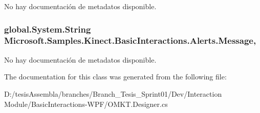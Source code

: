 No hay documentación de metadatos disponible. 

\hypertarget{class_microsoft_1_1_samples_1_1_kinect_1_1_basic_interactions_1_1_alerts_ab04d0ef02aabf1f3c600ee8a2063e6bb}{
\subsubsection[{Message}]{\setlength{\rightskip}{0pt plus 5cm}global.\-System.\-String Microsoft.\-Samples.\-Kinect.\-Basic\-Interactions.\-Alerts.\-Message\hspace{0.3cm}{\ttfamily [get]}, {\ttfamily [set]}}}\label{class_microsoft_1_1_samples_1_1_kinect_1_1_basic_interactions_1_1_alerts_ab04d0ef02aabf1f3c600ee8a2063e6bb}


No hay documentación de metadatos disponible. 



The documentation for this class was generated from the following file\-:\begin{DoxyCompactItemize}
\item 
D\-:/tesis\-Assembla/branches/\-Branch\-\_\-\-Tesis\-\_\-\-Sprint01/\-Dev/\-Interaction Module/\-Basic\-Interactions-\/\-W\-P\-F/O\-M\-K\-T.\-Designer.\-cs\end{DoxyCompactItemize}
